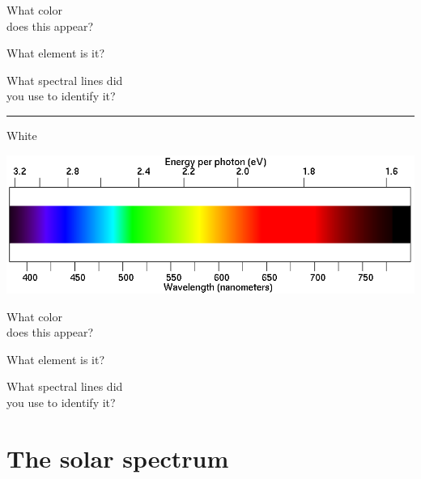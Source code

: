 \documentclass[11pt]{article}
\begin{document}
\begin{minipage}{0.33\textwidth}
	What color \\does this appear?
\end{minipage}
\begin{minipage}{0.33\textwidth}
	What element is it?
\end{minipage}
\begin{minipage}{0.33\textwidth}
	What spectral lines did\\
	you use to identify it?
\end{minipage}

\vspace{1.2in}
\hrule
\begin{minipage}{0.1\textwidth}
	\begin{center}
		\large White
	\end{center}
\end{minipage}
\begin{minipage}{0.7\textwidth}
	\includegraphics[width=\textwidth]{spectrum2.png}
\end{minipage}


\begin{minipage}{0.33\textwidth}
	What color \\does this appear?
\end{minipage}
\begin{minipage}{0.33\textwidth}
	What element is it?
\end{minipage}
\begin{minipage}{0.33\textwidth}
	What spectral lines did\\
	you use to identify it?
\end{minipage}

\vspace{1.2in}

\newpage

\section{The solar spectrum}
\end{document}
